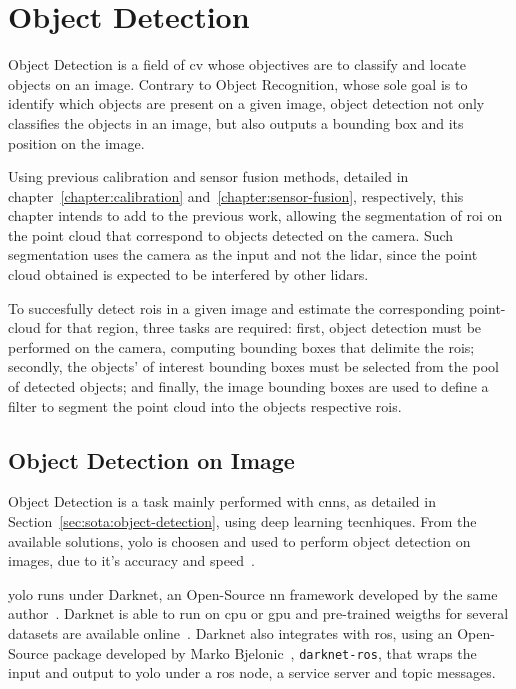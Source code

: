 \chapter{Object Detection}
\label{chapter:object-detection}

Object Detection is a field of \acf{cv} whose objectives are to classify and locate objects on an image. Contrary to Object Recognition, whose sole goal is to identify which objects are present on a given image, object detection not only classifies the objects in an image, but also outputs a bounding box and its position on the image. 

Using previous calibration and sensor fusion methods, detailed in chapter~\ref{chapter:calibration} and~\ref{chapter:sensor-fusion}, respectively, this chapter intends to add to the previous work, allowing the segmentation of \acf{roi} on the point cloud that correspond to objects detected on the camera. Such segmentation uses the camera as the input and not the \ac{lidar}, since the point cloud obtained is expected to be interfered by other \acp{lidar}.

To succesfully detect \acp{roi} in a given image and estimate the corresponding point-cloud for that region, three tasks are required: first, object detection must be performed on the camera, computing bounding boxes that delimite the \acp{roi}; secondly, the objects' of interest bounding boxes must be selected from the pool of detected objects; and finally, the image bounding boxes are used to define a filter to segment the point cloud into the objects respective \acp{roi}.

\section{Object Detection on Image}
Object Detection is a task mainly performed with \acfp{cnn}, as detailed in Section~\ref{sec:sota:object-detection}, using deep learning tecnhiques. From the available solutions, \ac{yolo} is choosen and used to perform object detection on images, due to it's accuracy and speed~\cite{Redmon2016, Redmon2017}. 

\ac{yolo} runs under Darknet, an Open-Source \acf{nn} framework developed by the same author~\cite{Redmon2013}. Darknet is able to run on \ac{cpu} or \ac{gpu} and pre-trained weigths for several datasets are available online~\cite{Redmon2013}. Darknet also integrates with \ac{ros}, using an Open-Source package developed by Marko Bjelonic~\cite{MarkoBjelonic}, \texttt{darknet-ros}, that wraps the input and output to \ac{yolo} under a \ac{ros} node, a service server and topic messages.

